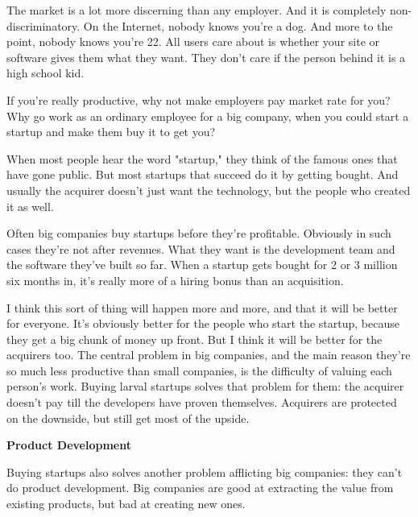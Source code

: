 The market
                    is a lot more discerning than any employer. And it is
                    completely non-discriminatory. On the Internet, nobody knows
                    you're a dog. And more to the point, nobody knows you're 22.
                    All users care about is whether your site or software gives
                    them what they want. They don't care if the person behind it
                    is a high school kid.

If you're really
                    productive, why not make employers pay market rate for you?
                    Why go work as an ordinary employee for a big company, when
                    you could start a startup and make them buy it to get
                    you?

When most people hear the word "startup,"
                    they think of the famous ones that have gone public. But
                    most startups that succeed do it by getting bought. And
                    usually the acquirer doesn't just want the technology, but
                    the people who created it as well.

Often big
                    companies buy startups before they're profitable. Obviously
                    in such cases they're not after revenues. What they want is
                    the development team and the software they've built so far.
                    When a startup gets bought for 2 or 3 million six months in,
                    it's really more of a hiring bonus than an acquisition.

I
                    think this sort of thing will happen more and more, and that
                    it will be better for everyone. It's obviously better for
                    the people who start the startup, because they get a big
                    chunk of money up front. But I think it will be better for
                    the acquirers too. The central problem in big companies, and
                    the main reason they're so much less productive than small
                    companies, is the difficulty of valuing each person's work.
                    Buying larval startups solves that problem for them: the
                    acquirer doesn't pay till the developers have proven
                    themselves. Acquirers are protected on the downside, but
                    still get most of the upside.

\textbf{Product Development}

Buying startups also solves another problem
                    afflicting big companies: they can't do product development.
                    Big companies are good at extracting the value from existing
                    products, but bad at creating new ones.


